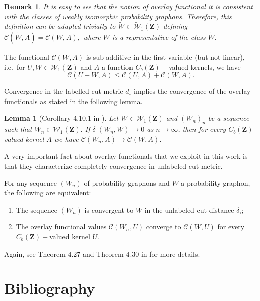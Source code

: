 \documentclass[12pt,twoside,a4paper]{article}
\newtheorem{lemma}[theorem]{Lemma}
\newtheorem{remark}[theorem]{Remark}
\newcommand{\Space}{\mathbf{Z}}
\newcommand{\CbFunct}{C_b(\Space)}
\newcommand{\Graphon}{\mathcal{W}_1}
\newcommand{\UGraphon}{\widetilde{\mathcal{W}}_1}
\begin{document}
\begin{remark}\label{Rmk:OverlayClasses}
It is easy to see that the notion of overlay functional it is consistent with the classes of weakly isomorphic probability graphons. Therefore, this definition can be adapted trivially to $\widetilde{W}\in \UGraphon(\Space)$ defining  $\mathcal{C}(\widetilde{W}, A)=\mathcal{C}(W, A),$ where $W$ is a representative of the class $\widetilde{W}.$
\end{remark}


The functional $\mathcal{C}(W, A)$ is sub-additive in the first variable (but not linear), i.e.\ for $ U,W \in \Graphon(\Space)$ and $A$ a function  $\CbFunct-$valued kernels, we have
\begin{equation}\label{subaddOverlay}
    \mathcal{C}( U+ W, A) \leq \mathcal{C}( U, A)+\mathcal{C}( W, A).
\end{equation}

Convergence in the labelled cut metric $d_{\square}$ implies the convergence of the overlay functionals as stated in the following lemma.

\begin{lemma}[Corollary 4.10.1 in \cite{zucal2024probabilitygraphonsrightconvergence}]\label{CorSequencesEqOv}
 Let $W\in\Graphon(\Space)$ and $(W_n)_n$ be a sequence such that $W_n\in \Graphon(\Space).$ If $\delta_{\square}( W_n, W) \rightarrow 0$ as $n \rightarrow \infty$, then for every $\CbFunct$-valued kernel $A$ we have $\mathcal{C}(W_n, A) \rightarrow \mathcal{C}(W, A)$.
\end{lemma}


A very important fact about overlay functionals that we exploit in this work is that they characterize completely convergence in unlabeled cut metric.

\begin{theorem}\label{ThmEquivalenceConvQuotientOverlayVersion2}
For any sequence $( W_n)$ of probability graphons and $ W$ a probability graphon, the following are equivalent:
\begin{enumerate}

\item  The sequence $( W_n)$ is convergent to $ W$ in the unlabeled cut distance $\delta_{\square};$
\item The overlay functional values $\mathcal{C}( W_n, U)$ converge to $\mathcal{C}( W, U)$ for every $\CbFunct-$valued kernel $U.$
\end{enumerate}
\end{theorem}
 Again, see Theorem 4.27 and Theorem 4.30 in \cite{zucal2024probabilitygraphonsrightconvergence} for more details.  

\medskip
\newpage
\section*{Bibliography}


\end{document}
